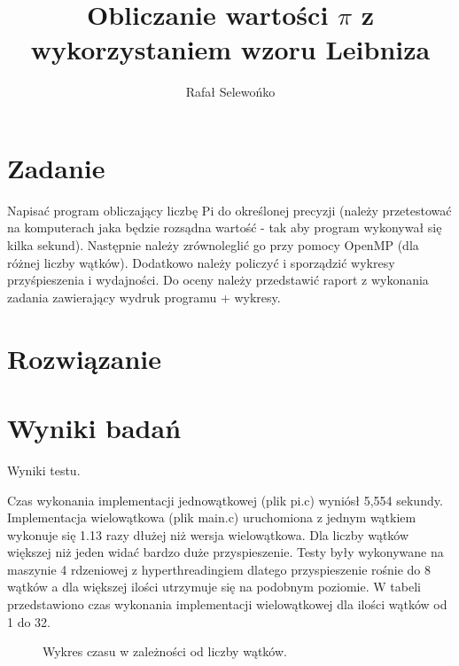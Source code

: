 \documentclass[a4paper,12pt]{article}
\title{Obliczanie wartości $\pi$ z wykorzystaniem wzoru Leibniza}
\author{Rafał Selewońko}
\begin{document}
\maketitle
 
\section{Zadanie}\label{sec:zadanie}
Napisać program obliczający liczbę Pi do określonej precyzji (należy przetestować na komputerach jaka będzie rozsądna wartość - tak aby program wykonywał się kilka sekund). Następnie należy zrównoleglić go przy pomocy OpenMP (dla różnej liczby wątków). Dodatkowo należy policzyć i sporządzić wykresy przyśpieszenia i wydajności. Do oceny należy przedstawić raport z wykonania zadania zawierający wydruk programu + wykresy.

\pagebreak
\section{Rozwiązanie}\label{sec:kod}


\pagebreak




\section{Wyniki badań}

\begin{table}[t]
\centering
{}
\caption{Wyniki testu.}
\label{tabela}
\end{table}

Czas wykonania implementacji jednowątkowej (plik pi.c) wyniósł 5,554 sekundy. Implementacja wielowątkowa (plik main.c) uruchomiona z jednym wątkiem wykonuje się 1.13 razy dłużej niż wersja wielowątkowa. Dla liczby wątków większej niż jeden widać bardzo duże przyspieszenie. Testy były wykonywane na maszynie 4 rdzeniowej z hyperthreadingiem dlatego przyspieszenie rośnie do 8 wątków a dla większej ilości utrzymuje się na podobnym poziomie. W tabeli przedstawiono czas wykonania implementacji wielowątkowej dla ilości wątków od 1 do 32.

\begin{figure}[ht!]
    \centering
    \caption{Wykres czasu w zależności od liczby wątków.}
    \label{wykres_czas}
\end{figure}
\end{document}
